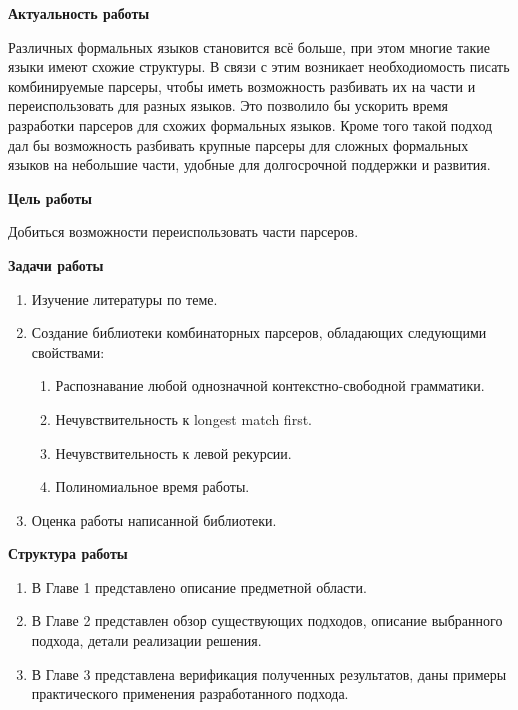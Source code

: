 \documentclass[times]{itmo-student-thesis}
\begin{document}
\tableofcontents

\startprefacepage
\textbf{Актуальность работы}

Различных формальных языков становится всё больше, при этом многие такие языки имеют схожие структуры. В связи с этим
возникает необходиомость писать комбинируемые парсеры, чтобы иметь возможность разбивать их на части и переиспользовать для
разных языков. Это позволило бы ускорить время разработки парсеров для схожих формальных языков. Кроме того такой
подход дал бы возможность разбивать крупные парсеры для сложных формальных языков на небольшие части, удобные для
долгосрочной поддержки и развития.

\textbf{Цель работы}

Добиться возможности переиспользовать части парсеров.

\textbf{Задачи работы}

\begin{enumerate}
  \item Изучение литературы по теме.
  \item Создание библиотеки комбинаторных парсеров, обладающих следующими свойствами:
    \begin{enumerate}
        \item Распознавание любой однозначной контекстно-свободной грамматики.
        \item Нечувствительность к longest match first.
        \item Нечувствительность к левой рекурсии.
        \item Полиномиальное время работы.
    \end{enumerate}
  \item Оценка работы написанной библиотеки.
\end{enumerate}



\textbf{Структура работы}

\begin{enumerate}
    \item В Главе 1 представлено описание предметной области.
    \item В Главе 2 представлен обзор существующих подходов, описание выбранного подхода, детали реализации решения.
    \item В Главе 3 представлена верификация полученных результатов, даны примеры практического применения 
    разработанного подхода.
\end{enumerate}
\end{document}
